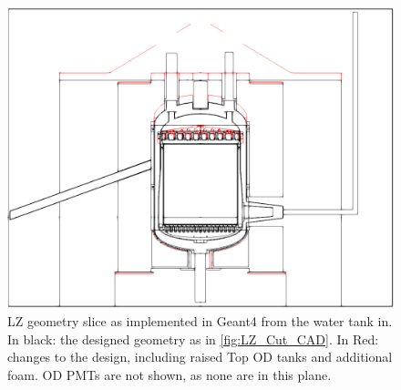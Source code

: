 \begin{figure}[]
\includegraphics[width=\textwidth]{Figures/Geometry/geometry_differences_black_and_white.png}
\centering
\caption{LZ geometry slice as implemented in Geant4 from the water tank in. In black: the designed geometry as in \autoref{fig:LZ_Cut_CAD}. In Red: changes to the design, including raised Top OD tanks and additional foam. OD PMTs are not shown, as none are in this plane.}
\label{fig:Geometry_Differences}
\end{figure}

